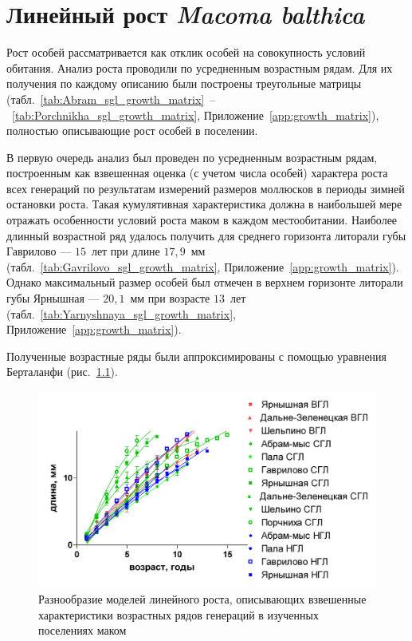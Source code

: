     \chapter{Линейный рост {\it Macoma balthica}}
Рост особей рассматривается как отклик особей на совокупность условий обитания. 
Анализ роста проводили по усредненным возрастным рядам. 
Для их получения по каждому описанию   были   построены   треугольные   матрицы   (табл.~\ref{tab:Abram_sgl_growth_matrix}~--~\ref{tab:Porchnikha_sgl_growth_matrix},   Приложение~\ref{app:growth_matrix}),   полностью описывающие рост особей в поселении.

В   первую   очередь   анализ   был   проведен   по  усредненным   возрастным   рядам, построенным как взвешенная оценка (с учетом числа особей) характера роста всех генераций по   результатам   измерений   размеров  моллюсков  в   периоды   зимней   остановки   роста.  
Такая кумулятивная   характеристика   должна   в   наибольшей   мере   отражать   особенности   условий роста маком в каждом местообитании.
Наиболее длинный возрастной ряд удалось получить для среднего горизонта литорали губы Гаврилово --- $15$~лет при длине $17,9$~мм (табл.~\ref{tab:Gavrilovo_sgl_growth_matrix},   Приложение~\ref{app:growth_matrix}). 
Однако максимальный размер особей был отмечен в верхнем горизонте литорали губы Ярнышная --- $20,1$~мм при возрасте $13$~лет (табл.~\ref{tab:Yarnyshnaya_sgl_growth_matrix},   Приложение~\ref{app:growth_matrix}). 

Полученные   возрастные   ряды   были   аппроксимированы   с   помощью   уравнения Берталанфи   (рис.~\ref{ris:Barents_growth_gorizonts_all}).
    \begin{figure}[p]
        \includegraphics[width=\textwidth]{../Barenc_Sea/growth_from_MSc/Rost_gorizonts_all.jpg}
    \caption{Разнообразие моделей линейного роста, описывающих взвешенные характеристики возрастных рядов генераций в изученных поселениях маком}
    \label{ris:Barents_growth_gorizonts_all}
    \end{figure}

